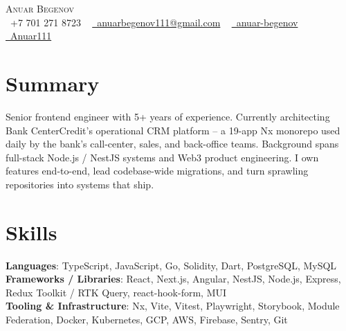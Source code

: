 \documentclass[letterpaper,11pt]{article}
\begin{document}
\begin{center}
    {\Huge \scshape Anuar Begenov} \\ \vspace{1pt}
    \small
    \raisebox{-0.1\height}\faPhone\ +7 701 271 8723 ~
    \href{mailto:anuarbegenov111@gmail.com}{\faEnvelope\ anuarbegenov111@gmail.com} ~
    \href{https://www.linkedin.com/in/anuar-begenov-20a9aa204/}{\faLinkedin\ anuar-begenov}  ~
    \href{https://github.com/Anuar111}{\faGithub\ Anuar111}
    \vspace{-8pt}
\end{center}


\section{Summary}
  \small{Senior frontend engineer with 5+ years of experience. Currently architecting Bank CenterCredit's operational CRM platform -- a 19-app Nx monorepo used daily by the bank's call-center, sales, and back-office teams. Background spans full-stack Node.js / NestJS systems and Web3 product engineering. I own features end-to-end, lead codebase-wide migrations, and turn sprawling repositories into systems that ship.}
\vspace{-12pt}

\section{Skills}
 \begin{itemize}[leftmargin=0.1in, label={}]
    \small{\item{
     \textbf{Languages}{: TypeScript, JavaScript, Go, Solidity, Dart, PostgreSQL, MySQL} \\
     \textbf{Frameworks / Libraries}{: React, Next.js, Angular, NestJS, Node.js, Express, Redux Toolkit / RTK Query, react-hook-form, MUI} \\
     \textbf{Tooling \& Infrastructure}{: Nx, Vite, Vitest, Playwright, Storybook, Module Federation, Docker, Kubernetes, GCP, AWS, Firebase, Sentry, Git}\\

    }}
 \end{itemize}
 \vspace{-20pt}

\end{document}
